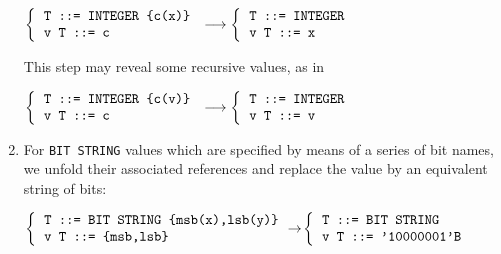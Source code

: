 \begin{enumerate}
        \begin{center}
        {\small
           $\left\{
              \begin{tabular}{l}
                 \verb+T ::= INTEGER {c(x)}+\\
                 \verb+v T ::= c+
              \end{tabular}
            \right.
           \longrightarrow
           \left\{
              \begin{tabular}{l}
                \verb+T ::= INTEGER+\\
                \verb+v T ::= x+
              \end{tabular}
           \right.$}
        \end{center}

        This step may reveal some recursive values, as in

        \begin{center}
        {\small
           $\left\{
              \begin{tabular}{l}
                 \verb+T ::= INTEGER {c(v)}+\\
                 \verb+v T ::= c+
              \end{tabular}
            \right.
           \longrightarrow
           \left\{
              \begin{tabular}{l}
                \verb+T ::= INTEGER+\\
                \verb+v T ::= v+
              \end{tabular}
            \right.$}
        \end{center}

  \item For \texttt{\small BIT STRING} values which are specified by
  means of a series of bit names, we unfold their associated
  references and replace the value by an equivalent string of bits:

  \begin{center}
        {\small
           $\left\{
              \begin{tabular}{l}
                \verb+T ::= BIT STRING {msb(x),lsb(y)}+\\
                \verb+v T ::= {msb,lsb}+
              \end{tabular}
            \right.\!\!
            \rightarrow\!
            \left\{
              \begin{tabular}{l}
                \verb+T ::= BIT STRING+\\
                \verb+v T ::= '10000001'B+
              \end{tabular}
            \right.$
        }
  \end{center}


\end{enumerate}
